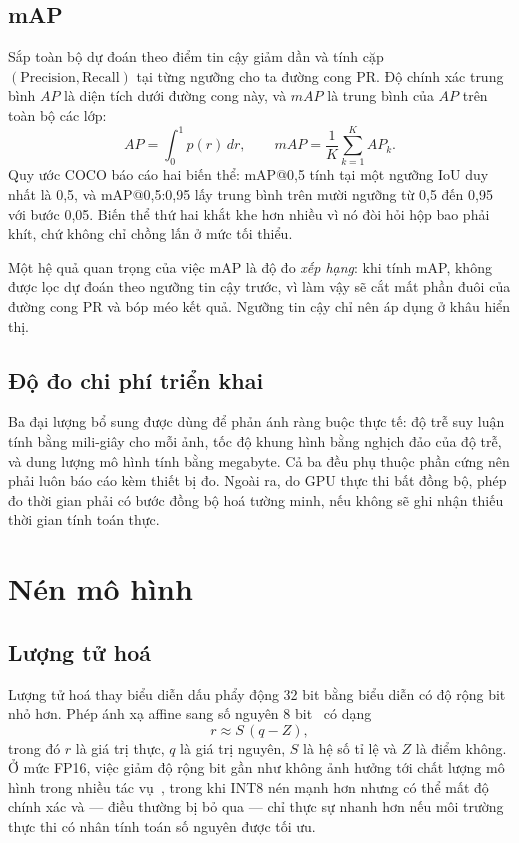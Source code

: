\subsection{mAP}

Sắp toàn bộ dự đoán theo điểm tin cậy giảm dần và tính cặp $(\text{Precision}, \text{Recall})$ tại
từng ngưỡng cho ta đường cong PR. Độ chính xác trung bình $AP$ là diện tích dưới đường cong này,
và $mAP$ là trung bình của $AP$ trên toàn bộ các lớp:
\begin{equation}
\label{eq:map}
AP = \int_{0}^{1} p(r)\, dr, \qquad
mAP = \frac{1}{K} \sum_{k=1}^{K} AP_k .
\end{equation}
Quy ước COCO báo cáo hai biến thể: mAP@0,5 tính tại một ngưỡng IoU duy nhất là 0,5, và mAP@0,5:0,95
lấy trung bình trên mười ngưỡng từ 0,5 đến 0,95 với bước 0,05. Biến thể thứ hai khắt khe hơn nhiều
vì nó đòi hỏi hộp bao phải khít, chứ không chỉ chồng lấn ở mức tối thiểu.

Một hệ quả quan trọng của việc mAP là độ đo \emph{xếp hạng}: khi tính mAP, không được lọc dự đoán
theo ngưỡng tin cậy trước, vì làm vậy sẽ cắt mất phần đuôi của đường cong PR và bóp méo kết quả.
Ngưỡng tin cậy chỉ nên áp dụng ở khâu hiển thị.

\subsection{Độ đo chi phí triển khai}

Ba đại lượng bổ sung được dùng để phản ánh ràng buộc thực tế: độ trễ suy luận tính bằng
mili-giây cho mỗi ảnh, tốc độ khung hình bằng nghịch đảo của độ trễ, và dung lượng mô hình tính
bằng megabyte. Cả ba đều phụ thuộc phần cứng nên phải luôn báo cáo kèm thiết bị đo. Ngoài ra, do
GPU thực thi bất đồng bộ, phép đo thời gian phải có bước đồng bộ hoá tường minh, nếu không sẽ ghi
nhận thiếu thời gian tính toán thực.

\section{Nén mô hình}

\subsection{Lượng tử hoá}

Lượng tử hoá thay biểu diễn dấu phẩy động 32 bit bằng biểu diễn có độ rộng bit nhỏ hơn. Phép ánh
xạ affine sang số nguyên 8 bit~\cite{jacob2018quantization} có dạng
\begin{equation}
\label{eq:quant}
r \approx S\,(q - Z),
\end{equation}
trong đó $r$ là giá trị thực, $q$ là giá trị nguyên, $S$ là hệ số tỉ lệ và $Z$ là điểm không. Ở
mức FP16, việc giảm độ rộng bit gần như không ảnh hưởng tới chất lượng mô hình trong nhiều tác
vụ~\cite{micikevicius2018mixedprecision}, trong khi INT8 nén mạnh hơn nhưng có thể mất độ chính
xác và --- điều thường bị bỏ qua --- chỉ thực sự nhanh hơn nếu môi trường thực thi có nhân tính
toán số nguyên được tối ưu.


